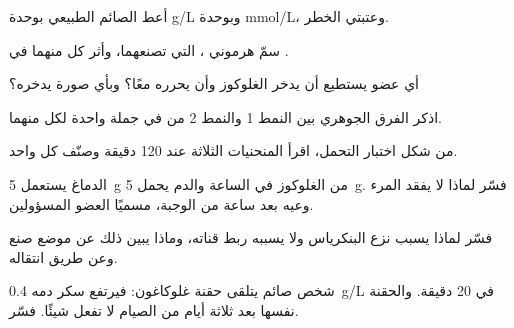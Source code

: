\begin{exercise}[$\star$]\label{exo:g12:glucose-and-diabetes:1}
أعط  الصائم الطبيعي بوحدة \unit{g/L} وبوحدة \unit{mmol/L}،
وعتبتي الخطر.
\end{exercise}

\begin{exercise}[$\star$]\label{exo:g12:glucose-and-diabetes:2}
سمّ هرموني ،  التي تصنعهما، وأثر كل منهما في .
\end{exercise}

\begin{exercise}[$\star$]\label{exo:g12:glucose-and-diabetes:3}
أي عضو يستطيع أن يدخر الغلوكوز وأن يحرره معًا؟ وبأي صورة يدخره؟
\end{exercise}

\begin{exercise}[$\star$]\label{exo:g12:glucose-and-diabetes:4}
اذكر الفرق الجوهري بين النمط 1 والنمط 2 من  في جملة واحدة
لكل منهما.
\end{exercise}

\begin{exercise}[$\star$]\label{exo:g12:glucose-and-diabetes:5}
من شكل اختبار التحمل، اقرأ المنحنيات الثلاثة عند 120 دقيقة وصنّف كل
واحد.
\end{exercise}

\begin{exercise}[$\star\star$]\label{exo:g12:glucose-and-diabetes:6}
الدماغ يستعمل \qty{5}{g} من الغلوكوز في الساعة والدم يحمل \qty{5}{g}.
فسّر لماذا لا يفقد المرء وعيه بعد ساعة من الوجبة، مسميًا العضو 
المسؤولين.
\end{exercise}

\begin{exercise}[$\star\star$]\label{exo:g12:glucose-and-diabetes:7}
فسّر لماذا يسبب نزع البنكرياس  ولا يسببه ربط قناته، وماذا
يبين ذلك عن موضع صنع  وعن طريق انتقاله.
\end{exercise}

\begin{exercise}[$\star\star$]\label{exo:g12:glucose-and-diabetes:8}
شخص صائم يتلقى حقنة غلوكاغون: فيرتفع سكر دمه \qty{0.4}{g/L} في 20
دقيقة. والحقنة نفسها بعد ثلاثة أيام من الصيام لا تفعل شيئًا. فسّر.
\end{exercise}


